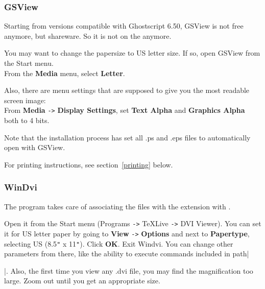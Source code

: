 \documentclass{article}
\begin{document}
\subsubsection{GSView}
Starting from versions compatible with Ghostscript 6.50, GSView is not
free anymore, but shareware. So it is not on the \CD{} anymore.

You may want to change the papersize to US letter size. If so,
open GSView from the Start menu.  \\
From the \textbf{Media} menu, select \textbf{Letter}.

Also, there are  menu settings that are supposed to give you the
most readable screen image:\\[4pt]
 From \textbf{Media} \verb+->+ \textbf{Display Settings}, 
set \textbf{Text Alpha} 
and \textbf{Graphics Alpha} both to 4 bits.

Note that the installation process has set all .ps and .eps files 
to automatically open with GSView.

For printing instructions, see section~\ref{printing} below.

\subsubsection{WinDvi}
\label{sub:windvi}

The  program takes care of associating the files
with the  extension with .

Open it from the Start menu (Programs \verb+->+ TeXLive \verb+->+ DVI Viewer).  
You can set it for US letter paper by going to \textbf{View} \verb+->+ \textbf{Options}
and next to \textbf{Papertype},
selecting US (8.5\verb+"+ x 11\verb+"+). 
Click \textbf{OK}. 
Exit Windvi.
You can change other parameters from there, like the ability to
execute commands included in path|\special{}|.
Also, the first time you 
view any .dvi file, you may find the magnification too large. Zoom out
until you get an appropriate size.

\end{document}
